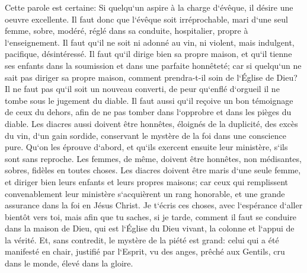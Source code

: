 \verse Cette parole est certaine: Si quelqu`un aspire à la charge d`évêque, il désire une oeuvre excellente. 
\verse Il faut donc que l`évêque soit irréprochable, mari d`une seul femme, sobre, modéré, réglé dans sa conduite, hospitalier, propre à l`enseignement. 
\verse Il faut qu`il ne soit ni adonné au vin, ni violent, mais indulgent, pacifique, désintéressé. 
\verse Il faut qu`il dirige bien sa propre maison, et qu`il tienne ses enfants dans la soumission et dans une parfaite honnêteté; 
\verse car si quelqu`un ne sait pas diriger sa propre maison, comment prendra-t-il soin de l`Église de Dieu? 
\verse Il ne faut pas qu`il soit un nouveau converti, de peur qu`enflé d`orgueil il ne tombe sous le jugement du diable. 
\verse Il faut aussi qu`il reçoive un bon témoignage de ceux du dehors, afin de ne pas tomber dans l`opprobre et dans les pièges du diable. 
\verse Les diacres aussi doivent être honnêtes, éloignés de la duplicité, des excès du vin, d`un gain sordide, 
\verse conservant le mystère de la foi dans une conscience pure. 
\verse Qu`on les éprouve d`abord, et qu`ils exercent ensuite leur ministère, s`ils sont sans reproche. 
\verse Les femmes, de même, doivent être honnêtes, non médisantes, sobres, fidèles en toutes choses. 
\verse Les diacres doivent être maris d`une seule femme, et diriger bien leurs enfants et leurs propres maisons; 
\verse car ceux qui remplissent convenablement leur ministère s`acquièrent un rang honorable, et une grande assurance dans la foi en Jésus Christ. 
\verse Je t`écris ces choses, avec l`espérance d`aller bientôt vers toi, 
\verse mais afin que tu saches, si je tarde, comment il faut se conduire dans la maison de Dieu, qui est l`Église du Dieu vivant, la colonne et l`appui de la vérité. 
\verse Et, sans contredit, le mystère de la piété est grand: celui qui a été manifesté en chair, justifié par l`Esprit, vu des anges, prêché aux Gentils, cru dans le monde, élevé dans la gloire. 

\chapter{}

